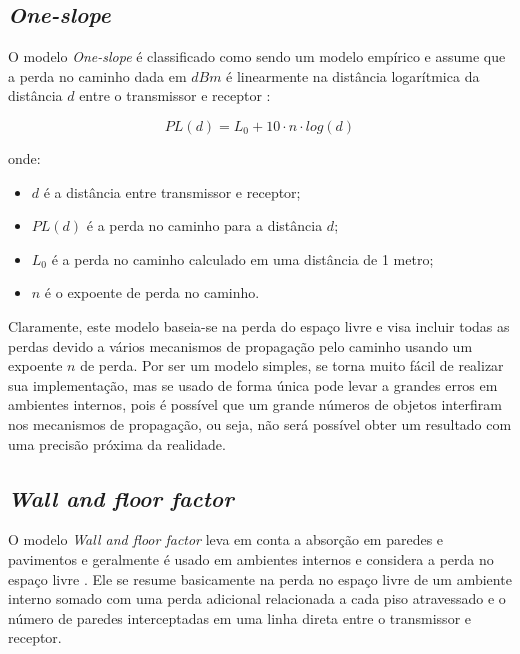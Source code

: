\documentclass[
	12pt,				%
	twoside,			%
	a4paper,			%
	english,			%
	french,				%
	spanish,			%
	brazil				%
	]{abntex2}
\begin{document}
\subsection{\texorpdfstring{\emph{One-slope}}{One-slope}}\label{sec:one_slope}

O modelo \emph{One-slope} é classificado como sendo um modelo empírico e
assume que a perda no caminho dada em \(dBm\) é linearmente na distância
logarítmica da distância \(d\) entre o transmissor e receptor
\cite{LUO}:

\begin{equation}
PL(d) = L_{0} + 10 \cdot n \cdot log(d)
\end{equation}

onde:

\begin{itemize}
\item
  \(d\) é a distância entre transmissor e receptor;
\item
  \(PL(d)\) é a perda no caminho para a distância \(d\);
\item
  \(L_{0}\) é a perda no caminho calculado em uma distância de 1 metro;
\item
  \(n\) é o expoente de perda no caminho.
\end{itemize}

Claramente, este modelo baseia-se na perda do espaço livre e visa
incluir todas as perdas devido a vários mecanismos de propagação pelo
caminho usando um expoente \(n\) de perda. Por ser um modelo simples, se
torna muito fácil de realizar sua implementação, mas se usado de forma
única pode levar a grandes erros em ambientes internos, pois é possível
que um grande números de objetos interfiram nos mecanismos de
propagação, ou seja, não será possível obter um resultado com uma
precisão próxima da realidade.

\subsection{\texorpdfstring{\emph{Wall and floor
factor}}{Wall and floor factor}}\label{sec:wall_floor}

O modelo \emph{Wall and floor factor} leva em conta a absorção em
paredes e pavimentos e geralmente é usado em ambientes internos e
considera a perda no espaço livre \cite{LUO, RAPPAPORT}. Ele se resume
basicamente na perda no espaço livre de um ambiente interno somado com
uma perda adicional relacionada a cada piso atravessado e o número de
paredes interceptadas em uma linha direta entre o transmissor e
receptor.
\end{document}
